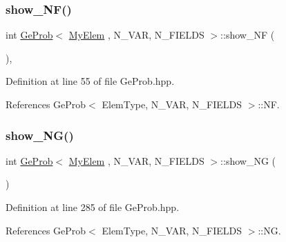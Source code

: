 \mbox{\label{classGeProb_ac7f36c8a5ae46b8ddc8cdd8db059e9cc}} 
\subsubsection{\texorpdfstring{show\+\_\+\+N\+F()}{show\_NF()}}
{\footnotesize\ttfamily int \hyperlink{classGeProb}{Ge\+Prob}$<$ \hyperlink{DG__Prob_8h_a83cd887ced9a6587428f267e50cd4787}{My\+Elem} , N\+\_\+\+V\+AR, N\+\_\+\+F\+I\+E\+L\+DS $>$\+::show\+\_\+\+NF (\begin{DoxyParamCaption}{ }\end{DoxyParamCaption})\hspace{0.3cm}{\ttfamily [inline]}, {\ttfamily [inherited]}}



Definition at line 55 of file Ge\+Prob.\+hpp.



References Ge\+Prob$<$ Elem\+Type, N\+\_\+\+V\+A\+R, N\+\_\+\+F\+I\+E\+L\+D\+S $>$\+::\+NF.

\mbox{\label{classGeProb_a2f37b74c21a3bdc3fc112babc8a0123b}} 
\subsubsection{\texorpdfstring{show\+\_\+\+N\+G()}{show\_NG()}}
{\footnotesize\ttfamily int \hyperlink{classGeProb}{Ge\+Prob}$<$ \hyperlink{DG__Prob_8h_a83cd887ced9a6587428f267e50cd4787}{My\+Elem} , N\+\_\+\+V\+AR, N\+\_\+\+F\+I\+E\+L\+DS $>$\+::show\+\_\+\+NG (\begin{DoxyParamCaption}{ }\end{DoxyParamCaption})\hspace{0.3cm}{\ttfamily [inherited]}}



Definition at line 285 of file Ge\+Prob.\+hpp.



References Ge\+Prob$<$ Elem\+Type, N\+\_\+\+V\+A\+R, N\+\_\+\+F\+I\+E\+L\+D\+S $>$\+::\+NG.

\mbox{\label{classGeProb_a6a4db729e1c6eab1165fb861b16649ac}} 
